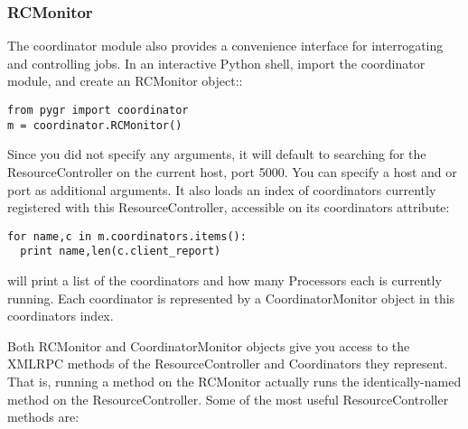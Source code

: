 \documentclass{howto}
\begin{document}
\subsubsection{RCMonitor}

The coordinator module also provides a convenience interface for interrogating and controlling jobs.  In an interactive Python shell, import the coordinator module, and create an RCMonitor object::

\begin{verbatim}
from pygr import coordinator
m = coordinator.RCMonitor()
\end{verbatim}

Since you did not specify any arguments, it will default to searching for the ResourceController on the current host, port 5000.  You can specify a host and or port as additional arguments.  It also loads an index of coordinators currently registered with this ResourceController, accessible on its coordinators attribute:

\begin{verbatim}
for name,c in m.coordinators.items():
  print name,len(c.client_report)
\end{verbatim}

will print a list of the coordinators and how many Processors each is currently running.  Each coordinator is represented by a CoordinatorMonitor object in this coordinators index.

Both RCMonitor and CoordinatorMonitor objects give you access to the XMLRPC methods of the ResourceController and Coordinators they represent.  That is, running a method on the RCMonitor actually runs the identically-named method on the ResourceController.  Some of the most useful ResourceController methods are:
\end{document}

